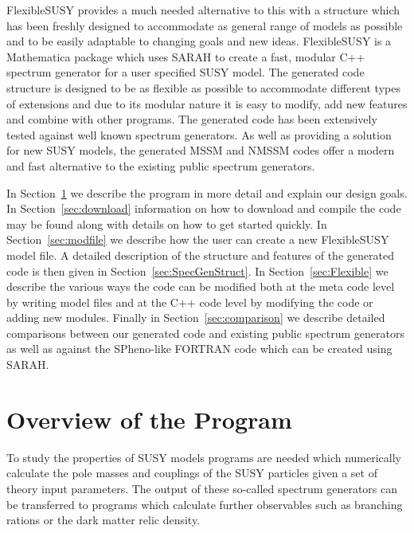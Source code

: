 \documentclass[final,3p,11pt,pdflatex]{elsarticle}
\makeatletter
\newcommand{\sarah}{SARAH\@\xspace}
\newcommand{\fs}{FlexibleSUSY\@\xspace}
\newcommand{\mathematica}{Mathematica\xspace}
\newcommand{\secref}[1]{Section~\ref{#1}}
\makeatother
\begin{document}
\fs provides a much needed alternative to this with a structure which
has been freshly designed to accommodate as general range of models as
possible and to be easily adaptable to changing goals and new
ideas. \fs is a \mathematica package which uses \sarah to create a
fast, modular C++ spectrum generator for a user specified SUSY model.
The generated code structure is designed to be as flexible as possible
to accommodate different types of extensions and due to its modular
nature it is easy to modify, add new features and combine with other
programs.  The generated code has been extensively tested against well
known spectrum generators. As well as providing a solution for new
SUSY models, the generated MSSM and NMSSM codes offer a modern and fast
alternative to the existing public spectrum generators.

In \secref{sec:Program} we describe the program in more detail and
explain our design goals.  In \secref{sec:download} information on how
to download and compile the code may be found along with details on
how to get started quickly.  In \secref{sec:modfile} we describe how
the user can create a new FlexibleSUSY model file. A detailed
description of the structure and features of the generated code is
then given in \secref{sec:SpecGenStruct}.  In \secref{sec:Flexible} we
describe the various ways the code can be modified both at the meta
code level by writing model files and at the C++ code level by
modifying the code or adding new modules. Finally in
\secref{sec:comparison} we describe detailed comparisons between our
generated code and existing public spectrum generators as well as
against the SPheno-like FORTRAN code which can be created using SARAH.


\section{Overview of the Program}
\label{sec:Program}

To study the properties of SUSY models programs are needed which
numerically calculate the pole masses and couplings of the SUSY
particles given a set of theory input parameters.  The output of these
so-called spectrum generators can be transferred to programs which
calculate further observables such as branching rations or the dark
matter relic density.
\end{document}
